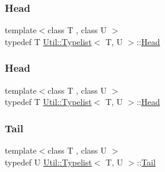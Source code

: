 \mbox{\label{structUtil_1_1Typelist_adc631e8685518837efd57d234d33982e}} 
\subsubsection{\texorpdfstring{Head}{Head}\hspace{0.1cm}{\footnotesize\ttfamily [2/3]}}
{\footnotesize\ttfamily template$<$class T , class U $>$ \\
typedef T \mbox{\hyperlink{structUtil_1_1Typelist}{Util\+::\+Typelist}}$<$ T, U $>$\+::\mbox{\hyperlink{structUtil_1_1Typelist_adc631e8685518837efd57d234d33982e}{Head}}}

\mbox{\label{structUtil_1_1Typelist_adc631e8685518837efd57d234d33982e}} 
\subsubsection{\texorpdfstring{Head}{Head}\hspace{0.1cm}{\footnotesize\ttfamily [3/3]}}
{\footnotesize\ttfamily template$<$class T , class U $>$ \\
typedef T \mbox{\hyperlink{structUtil_1_1Typelist}{Util\+::\+Typelist}}$<$ T, U $>$\+::\mbox{\hyperlink{structUtil_1_1Typelist_adc631e8685518837efd57d234d33982e}{Head}}}

\mbox{\label{structUtil_1_1Typelist_a9c02512c1b76c9340e36855f76ff5f01}} 
\subsubsection{\texorpdfstring{Tail}{Tail}\hspace{0.1cm}{\footnotesize\ttfamily [1/3]}}
{\footnotesize\ttfamily template$<$class T , class U $>$ \\
typedef U \mbox{\hyperlink{structUtil_1_1Typelist}{Util\+::\+Typelist}}$<$ T, U $>$\+::\mbox{\hyperlink{structUtil_1_1Typelist_a9c02512c1b76c9340e36855f76ff5f01}{Tail}}}

